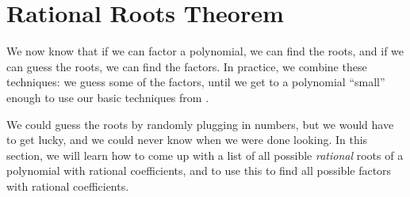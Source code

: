 \section{Rational Roots Theorem}
We now know that if we can factor a polynomial, we can find the roots, and if we can guess the roots, we can find the factors. In practice, we combine these techniques: we guess some of the factors, until we get to a polynomial ``small'' enough to use our basic techniques from .

We could guess the roots by randomly plugging in numbers, but we would have to get lucky, and we could never know when we were done looking. In this section, we will learn how to come up with a list of all possible \emph{rational} roots of a polynomial with rational coefficients, and to use this to find all possible factors with rational coefficients.
% 
 


%
%
% 
 
 
 
